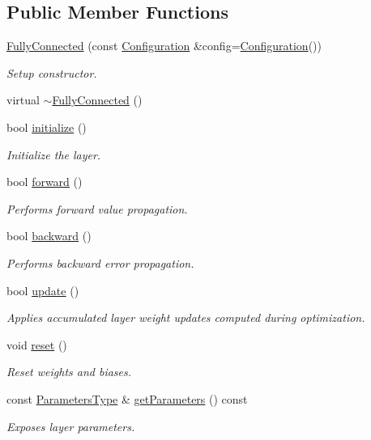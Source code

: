 \subsection*{Public Member Functions}
\begin{DoxyCompactItemize}
\item 
\hyperlink{classffnn_1_1layer_1_1_fully_connected_a9eaa4a8e35a5092b8b130b70eb553ad3}{Fully\-Connected} (const \hyperlink{classffnn_1_1layer_1_1_fully_connected_a0f17b9785828b21e00a8fe84fd173406}{Configuration} \&config=\hyperlink{classffnn_1_1layer_1_1_fully_connected_a0f17b9785828b21e00a8fe84fd173406}{Configuration}())
\begin{DoxyCompactList}\small\item\em Setup constructor. \end{DoxyCompactList}\item 
virtual \hyperlink{classffnn_1_1layer_1_1_fully_connected_a74d580a488e32e5d96f10a696853b595}{$\sim$\-Fully\-Connected} ()
\item 
bool \hyperlink{classffnn_1_1layer_1_1_fully_connected_a26c93b2711c548ca0e7e2dc864998f41}{initialize} ()
\begin{DoxyCompactList}\small\item\em Initialize the layer. \end{DoxyCompactList}\item 
bool \hyperlink{classffnn_1_1layer_1_1_fully_connected_ab346f0f7b59414c24e66db4d20d1d304}{forward} ()
\begin{DoxyCompactList}\small\item\em Performs forward value propagation. \end{DoxyCompactList}\item 
bool \hyperlink{classffnn_1_1layer_1_1_fully_connected_a4ce61344d755dd73e16d20b4ac36b481}{backward} ()
\begin{DoxyCompactList}\small\item\em Performs backward error propagation. \end{DoxyCompactList}\item 
bool \hyperlink{classffnn_1_1layer_1_1_fully_connected_a3bc0c2dd442b42b0c7806fb3d251c6d1}{update} ()
\begin{DoxyCompactList}\small\item\em Applies accumulated layer weight updates computed during optimization. \end{DoxyCompactList}\item 
void \hyperlink{classffnn_1_1layer_1_1_fully_connected_a260a662caa22fdeccc37079e3c62c9fb}{reset} ()
\begin{DoxyCompactList}\small\item\em Reset weights and biases. \end{DoxyCompactList}\item 
const \hyperlink{classffnn_1_1layer_1_1_fully_connected_aab9cb25e10620b406a13414ac81747fa}{Parameters\-Type} \& \hyperlink{classffnn_1_1layer_1_1_fully_connected_a2b4eb3fb45590f272e8ab0ff2069793d}{get\-Parameters} () const 
\begin{DoxyCompactList}\small\item\em Exposes layer parameters. \end{DoxyCompactList}\end{DoxyCompactItemize}
